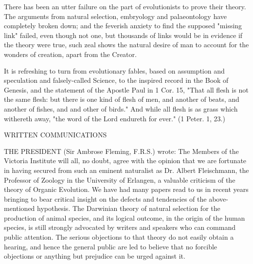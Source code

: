 There has been an utter failure on the part of evolutionists to prove their theory. The
arguments from natural selection, embryology and palaeontology have completely broken
down; and the feverish anxiety to find the supposed "missing link" failed, even though not
one, but thousands of links would be in evidence if the theory were true, such zeal shows the
natural desire of man to account for the wonders of creation, apart from the Creator.

It is refreshing to turn from evolutionary fables, based on assumption and speculation and
falsely-called Science, to the inspired record in the Book of Genesis, and the statement of the
Apostle Paul in 1 Cor. 15, "That all flesh is not the same flesh: but there is one kind of flesh
of men, and another of beats, and another of fishes, and and other of birds." And while all
flesh is as grass which withereth away, "the word of the Lord endureth for ever." (1 Peter. 1,
23.)

WRITTEN COMMUNICATIONS

THE PRESIDENT (Sir Ambrose Fleming, F.R.S.) wrote: The Members of the Victoria
Institute will all, no doubt, agree with the opinion that we are fortunate in having secured
from such an eminent naturalist as Dr. Albert Fleischmann, the Professor of Zoology in the
University of Erlangen, a valuable criticism of the theory of Organic Evolution. We have had
many papers read to us in recent years bringing to bear critical insight on the defects and
tendencies of the above-mentioned hypothesis. The Darwinian theory of natural selection for
the production of animal species, and its logical outcome, in the origin of the human species,
is still strongly advocated by writers and speakers who can command public attention. The
serious objections to that theory do not easily obtain a hearing, and hence the general public
are led to believe that no forcible objections or anything but prejudice can be urged against it.

